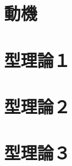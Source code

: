 \documentclass[dvipdfmx]{jsarticle}
\begin{document}
\section{動機}

\newpage

\section{型理論１}

\newpage

\section{型理論２}

\newpage

\newpage


\section{型理論３}

\end{document}
